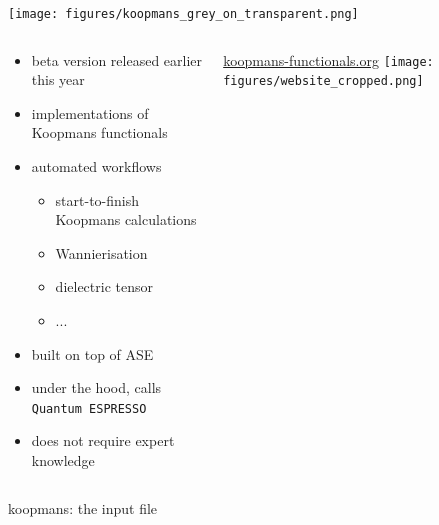 \documentclass[xcolor=table,aspectratio=169]{beamer}
\numberwithin{equation}{section}
\begin{document}
\begin{frame}{}
   \begin{center}
      \texttt{[image: figures/koopmans\_grey\_on\_transparent.png]}
   \end{center}

   \vspace{-2ex}

   \begin{columns}
      \begin{column}{0.55\textwidth}
         \begin{itemize}
            \item beta version released earlier this year\footnotemark[1]
            \item implementations of Koopmans functionals
            \item automated workflows
                  \begin{itemize}
                     \item start-to-finish Koopmans calculations
                     \item Wannierisation
                     \item dielectric tensor
                     \item ...
                  \end{itemize}
            \item built on top of ASE\footnotemark[2]
            \item under the hood, calls \texttt{Quantum ESPRESSO}
            \item does not require expert knowledge
         \end{itemize}
      \end{column}

      \begin{column}{0.4\textwidth}
         \centering
         \url{koopmans-functionals.org}
         \texttt{[image: figures/website\_cropped.png]}
      \end{column}
   \end{columns}
\end{frame}

\begin{frame}{koopmans: the input file}
   \begin{minipage}[t]{0.475\columnwidth}
      \inputminted[fontsize=\tiny,breaklines,lastline=20]{json}{scripts/si.json}
   \end{minipage}
   \hspace{0.025\textwidth}
   \begin{minipage}[t]{0.475\columnwidth}
      \inputminted[fontsize=\tiny,breaklines,firstline=21]{json}{scripts/si.json}
   \end{minipage}
\end{frame}
\end{document}
